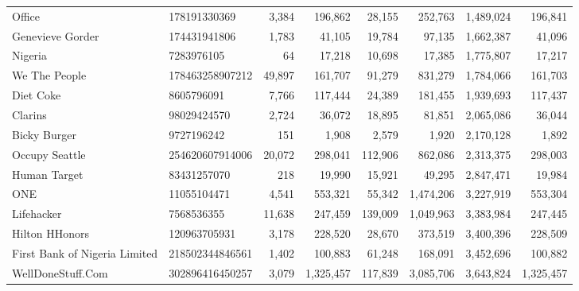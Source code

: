 \begin{longtable}{llrrrrrr}
                                            Office &     178191330369 &   3,384 &     196,862 &     28,155 &     252,763 &     1,489,024 &    196,841 \\
                                  Genevieve Gorder &     174431941806 &   1,783 &      41,105 &     19,784 &      97,135 &     1,662,387 &     41,096 \\
                                           Nigeria &       7283976105 &      64 &      17,218 &     10,698 &      17,385 &     1,775,807 &     17,217 \\
                                     We The People &  178463258907212 &  49,897 &     161,707 &     91,279 &     831,279 &     1,784,066 &    161,703 \\
                                         Diet Coke &       8605796091 &   7,766 &     117,444 &     24,389 &     181,455 &     1,939,693 &    117,437 \\
                                           Clarins &      98029424570 &   2,724 &      36,072 &     18,895 &      81,851 &     2,065,086 &     36,044 \\
                                      Bicky Burger &       9727196242 &     151 &       1,908 &      2,579 &       1,920 &     2,170,128 &      1,892 \\
                                    Occupy Seattle &  254620607914006 &  20,072 &     298,041 &    112,906 &     862,086 &     2,313,375 &    298,003 \\
                                      Human Target &      83431257070 &     218 &      19,990 &     15,921 &      49,295 &     2,847,471 &     19,984 \\
                                               ONE &      11055104471 &   4,541 &     553,321 &     55,342 &   1,474,206 &     3,227,919 &    553,304 \\
                                        Lifehacker &       7568536355 &  11,638 &     247,459 &    139,009 &   1,049,963 &     3,383,984 &    247,445 \\
                                    Hilton HHonors &     120963705931 &   3,178 &     228,520 &     28,670 &     373,519 &     3,400,396 &    228,509 \\
                     First Bank of Nigeria Limited &  218502344846561 &   1,402 &     100,883 &     61,248 &     168,091 &     3,452,696 &    100,882 \\
                                 WellDoneStuff.Com &  302896416450257 &   3,079 &   1,325,457 &    117,839 &   3,085,706 &     3,643,824 &  1,325,457 \\

\end{longtable}
